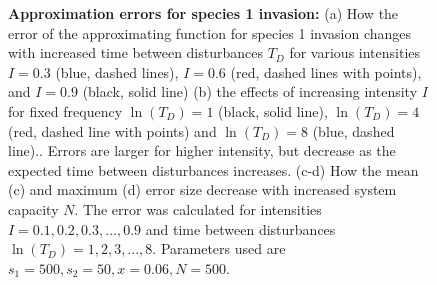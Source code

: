 \begin{figure}[th]
   \caption[Approximation errors for species 1 invasion]{\textbf{Approximation errors for species 1 invasion:} (a) How the error of the approximating function for species 1 invasion changes with increased time between disturbances $T_D$ for various intensities $I=0.3$ (blue, dashed lines), $I=0.6$ (red, dashed lines with points), and $I=0.9$ (black, solid line) (b) the effects of increasing intensity $I$ for fixed frequency $\ln(T_D)=1$ (black, solid line), $\ln(T_D)=4$ (red, dashed line with points) and $\ln(T_D)=8$ (blue, dashed line).. Errors are larger for higher intensity, but decrease as the expected time between disturbances increases. (c-d) How the mean (c) and maximum (d) error size decrease with increased system capacity $N$. The error was calculated for intensities $I=0.1,0.2,0.3,...,0.9$ and time between disturbances $\ln(T_D)=1,2,3,...,8.$ Parameters used are $s_1=500,s_2=50,x=0.06,N=500$.}
 \label{fig:approxerror1}
\end{figure}
